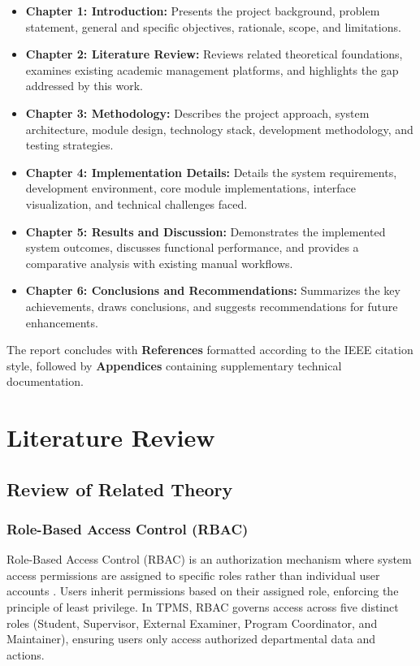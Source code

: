 \documentclass[12pt,a4paper]{report}
\begin{document}
\begin{itemize}
  \item \textbf{Chapter 1: Introduction:} Presents the project background, problem statement, general and specific objectives, rationale, scope, and limitations.
  
  \item \textbf{Chapter 2: Literature Review:} Reviews related theoretical foundations, examines existing academic management platforms, and highlights the gap addressed by this work.
  
  \item \textbf{Chapter 3: Methodology:} Describes the project approach, system architecture, module design, technology stack, development methodology, and testing strategies.
  
  \item \textbf{Chapter 4: Implementation Details:} Details the system requirements, development environment, core module implementations, interface visualization, and technical challenges faced.
  
  \item \textbf{Chapter 5: Results and Discussion:} Demonstrates the implemented system outcomes, discusses functional performance, and provides a comparative analysis with existing manual workflows.
  
  \item \textbf{Chapter 6: Conclusions and Recommendations:} Summarizes the key achievements, draws conclusions, and suggests recommendations for future enhancements.
\end{itemize}

The report concludes with \textbf{References} formatted according to the IEEE citation style, followed by \textbf{Appendices} containing supplementary technical documentation.

\chapter{Literature Review}

\section{Review of Related Theory}

\subsection{Role-Based Access Control (RBAC)}
Role-Based Access Control (RBAC) is an authorization mechanism where system access permissions are assigned to specific roles rather than individual user accounts \cite{ferraiolo2007rbac}. Users inherit permissions based on their assigned role, enforcing the principle of least privilege. In TPMS, RBAC governs access across five distinct roles (Student, Supervisor, External Examiner, Program Coordinator, and Maintainer), ensuring users only access authorized departmental data and actions.
\end{document}
